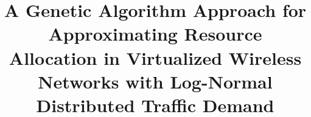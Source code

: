 \documentclass[onecolumn,draftcls]{IEEEtran}
\begin{document}
%
\title{A Genetic Algorithm Approach for Approximating Resource Allocation in Virtualized Wireless Networks with Log-Normal Distributed Traffic Demand}


\author{
}
\iffalse
\author{\IEEEauthorblockN{Kory Teague}
\IEEEauthorblockA{School of Electrical and\\Computer Engineering\\
Virginia Tech\\
Blacksburg, VA\\
Email: koryt@vt.edu}
\and
\\
\IEEEauthorblockN{Mohammad Abdel-Rahman}
\IEEEauthorblockA{School of Electrical and\\Computer Engineering\\
Virginia Tech\\
Blacksburg, VA\\
Email: mo7ammad@vt.edu}
\and
\\
\IEEEauthorblockN{Allen MacKenzie}
\IEEEauthorblockA{School of Electrical and\\Computer Engineering\\
Virginia Tech\\
Blacksburg, VA\\
Email: mackenab@vt.edu}}
\fi

\end{document}
